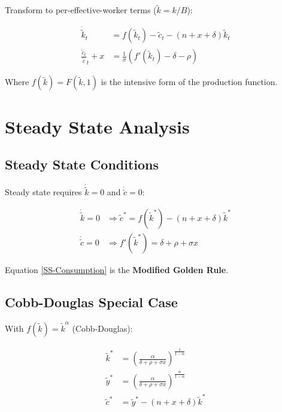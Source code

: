 \documentclass[a4paper,11pt]{article}
\newcommand{\ktilde}{\tilde{k}}
\newcommand{\ytilde}{\tilde{y}}
\newcommand{\ctilde}{\tilde{c}}
\begin{document}
Transform to per-effective-worker terms ($\ktilde = k / B$):

\begin{resultbox}
\begin{align*}
\dot{\ktilde}_t &= f(\ktilde_t) - \ctilde_t - (n + x + \delta)\ktilde_t
\tag{Dynamics-k} \\[4pt]
\frac{\dot{\ctilde}_t}{\ctilde}_t + x &= \frac{1}{\sigma}\left(f'(\ktilde_t) - \delta - \rho\right)
\tag{Dynamics-c}
\end{align*}
\end{resultbox}

Where $f(\ktilde) = F(\ktilde, 1)$ is the intensive form of the production function.

\section{Steady State Analysis}

\subsection*{Steady State Conditions}
Steady state requires $\dot{\ktilde} = 0$ and $\dot{\ctilde} = 0$:

\begin{resultbox}
\begin{align*}
\dot{\ktilde} = 0 &\Rightarrow \ctilde^* = f(\ktilde^*) - (n + x + \delta)\ktilde^*
\tag{SS-Capital} \label{SS-Capital} \\[4pt]
\dot{\ctilde} = 0 &\Rightarrow f'(\ktilde^*) = \delta + \rho + \sigma x
\tag{SS-Consumption} \label{SS-Consumption}
\end{align*}
\end{resultbox}

Equation \eqref{SS-Consumption} is the \textbf{Modified Golden Rule}.

\subsection*{Cobb-Douglas Special Case}

With $f(\ktilde) = \ktilde^\alpha$ (Cobb-Douglas):

\begin{resultbox}
\begin{align*}
\ktilde^* &= \left( \frac{\alpha}{\delta + \rho + \sigma x} \right)^{\frac{1}{1-\alpha}}
\tag{SS-k-Cobb} \\[4pt]
\ytilde^* &= \left( \frac{\alpha}{\delta + \rho + \sigma x} \right)^{\frac{\alpha}{1-\alpha}}
\tag{SS-y-Cobb} \\[4pt]
\ctilde^* &= \ytilde^* - (n + x + \delta)\ktilde^*
\tag{SS-c-Cobb}
\end{align*}
\end{resultbox}
\end{document}
